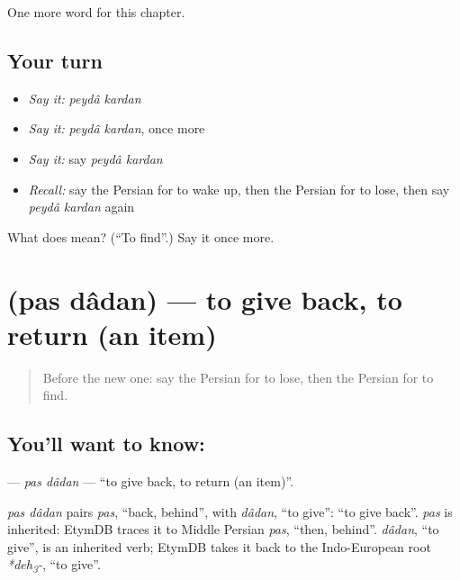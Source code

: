 \begin{grammarlens}[title={What you've built}]
One more word for this chapter.
\end{grammarlens}

\subsection*{Your turn}
\begin{itemize}
\raggedright
  \item \emph{Say it:} \emph{peydâ kardan}
  \item \emph{Say it:} \emph{peydâ kardan}, once more
  \item \emph{Say it:} say \emph{peydâ kardan}
  \item \emph{Recall:} say the Persian for to wake up, then the Persian for to lose, then say \emph{peydâ kardan} again
\end{itemize}

\begin{tcolorbox}[breakable,colback=teal!4,colframe=teal!35!black,title={Before you move on}]
What does   mean? (\textquotedblleft{}To find\textquotedblright{}.) Say it once more.
\end{tcolorbox}
\section[\texorpdfstring{\fa{پس} \fa{دادن} (pas dâdan)}{پس دادن (pas dâdan)}]{  (pas dâdan) — to give back, to return (an item)}

\label{lesson:FA-C141-pas-dadan}



\begin{quote}
Before the new one: say the Persian for to lose, then the Persian for to find.
\end{quote}

\subsection*{You'll want to know:  }
\textbf{ } — \emph{pas dâdan} — \textquotedblleft{}to give back, to return (an item)\textquotedblright{}.

\begin{cousinweb}
\emph{pas dâdan} pairs \emph{pas}, \textquotedblleft{}back, behind\textquotedblright{}, with \emph{dâdan}, \textquotedblleft{}to give\textquotedblright{}: \textquotedblleft{}to give back\textquotedblright{}. \emph{pas} is inherited: EtymDB traces it to Middle Persian \emph{pas}, \textquotedblleft{}then, behind\textquotedblright{}. \emph{dâdan}, \textquotedblleft{}to give\textquotedblright{}, is an inherited verb; EtymDB takes it back to the Indo-European root \emph{*deh\textsubscript{3}-}, \textquotedblleft{}to give\textquotedblright{}.
\end{cousinweb}

